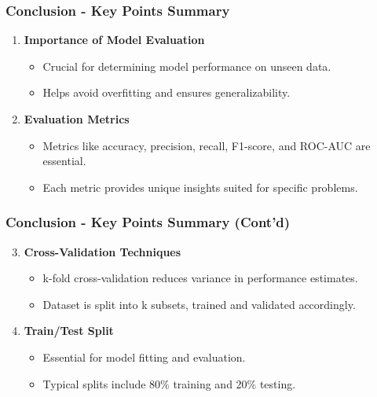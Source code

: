 \documentclass[aspectratio=169]{beamer}
\begin{document}
\begin{frame}[fragile]
    \frametitle{Conclusion - Key Points Summary}
    \begin{enumerate}
        \item \textbf{Importance of Model Evaluation}
        \begin{itemize}
            \item Crucial for determining model performance on unseen data.
            \item Helps avoid overfitting and ensures generalizability.
        \end{itemize}

        \item \textbf{Evaluation Metrics}
        \begin{itemize}
            \item Metrics like accuracy, precision, recall, F1-score, and ROC-AUC are essential.
            \item Each metric provides unique insights suited for specific problems.
        \end{itemize}
    \end{enumerate}
\end{frame}

\begin{frame}[fragile]
    \frametitle{Conclusion - Key Points Summary (Cont'd)}
    \begin{enumerate}
        \setcounter{enumi}{2} %
        \item \textbf{Cross-Validation Techniques}
        \begin{itemize}
            \item k-fold cross-validation reduces variance in performance estimates.
            \item Dataset is split into k subsets, trained and validated accordingly.
        \end{itemize}

        \item \textbf{Train/Test Split}
        \begin{itemize}
            \item Essential for model fitting and evaluation.
            \item Typical splits include 80\% training and 20\% testing.
        \end{itemize}
    \end{enumerate}
\end{frame}
\end{document}
